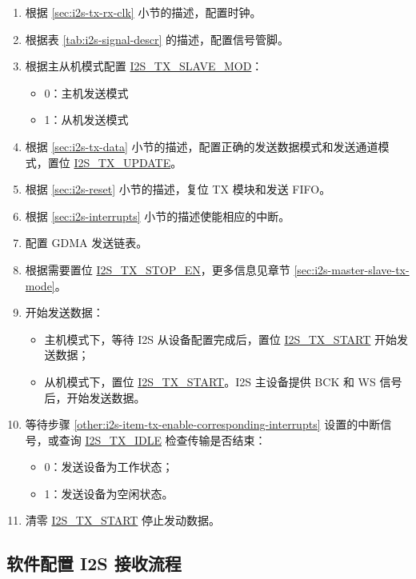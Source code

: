 \documentclass[main\_\_CN.tex]{subfiles}
\begin{document}
\begin{enumerate}
    \item 根据 \ref{sec:i2s-tx-rx-clk} 小节的描述，配置时钟。
    \item 根据表 \ref{tab:i2s-signal-descr} 的描述，配置信号管脚。
    \item 根据主从机模式配置 \hyperref[fielddesc:I2STXSLAVEMOD]{I2S\_TX\_SLAVE\_MOD}：
    \begin{itemize}
        \item 0：主机发送模式
        \item 1：从机发送模式
    \end{itemize}
    \item 根据 \ref{sec:i2s-tx-data} 小节的描述，配置正确的发送数据模式和发送通道模式，置位 \hyperref[fielddesc:I2STXUPDATE]{I2S\_TX\_UPDATE}。
    \item 根据 \ref{sec:i2s-reset} 小节的描述，复位 TX 模块和发送 FIFO。
    \item 根据 \ref{sec:i2s-interrupts} 小节的描述使能相应的中断。\label{other:i2s-item-tx-enable-corresponding-interrupts}
    \item 配置 GDMA 发送链表。 
    \item 根据需要置位 \hyperref[fielddesc:I2STXSTOPEN]{I2S\_TX\_STOP\_EN}，更多信息见章节 \ref{sec:i2s-master-slave-tx-mode}。
    \item 开始发送数据：
    \begin{itemize}
        \item 主机模式下，等待 I2S 从设备配置完成后，置位 \hyperref[fielddesc:I2STXSTART]{I2S\_TX\_START} 开始发送数据；
        \item 从机模式下，置位 \hyperref[fielddesc:I2STXSTART]{I2S\_TX\_START}。I2S 主设备提供 BCK 和 WS 信号后，开始发送数据。
    \end{itemize}
    \item 等待步骤 \ref{other:i2s-item-tx-enable-corresponding-interrupts} 设置的中断信号，或查询 \hyperref[fielddesc:I2STXIDLE]{I2S\_TX\_IDLE} 检查传输是否结束：
    \begin{itemize}
        \item 0：发送设备为工作状态；
        \item 1：发送设备为空闲状态。
    \end{itemize}
    \item 清零 \hyperref[fielddesc:I2STXSTART]{I2S\_TX\_START} 停止发动数据。
\end{enumerate}

\subsection{软件配置 I2S 接收流程}\label{sec:i2s-configure-i2s-rx-mode}
\end{document}
